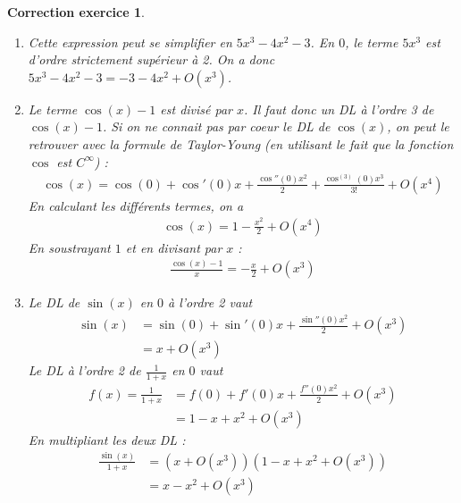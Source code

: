 \documentclass[12pt]{article}
\newtheorem{correction}{\bf Correction exercice}
\newenvironment{cor}{
\begin{correction}\smallskip\normalfont}{\end{correction}
}
\newif\ifcorrige\corrigetrue
\begin{document}
\ifcorrige
\color{magenta}
\begin{cor}
$\qquad$
\begin{enumerate}
\item Cette expression peut se simplifier en $5x^3 - 4x^2 -3$.
  En $0$, le terme $5x^3$ est d'ordre strictement supérieur à 2.
  On a donc $5x^3 - 4x^2 -3 = -3 - 4x^2 + O(x^3)$.

\item Le terme $\cos(x)-1$ est divisé par $x$. Il faut donc un DL à l'ordre 3 de $\cos(x)-1$.
  Si on ne connait pas par coeur le DL de $\cos(x)$, on peut le retrouver 
  avec la formule de Taylor-Young 
  (en utilisant le fait que la fonction $\cos$ est $C^{\infty}$) :
  \begin{align*}
    \cos(x) = \cos(0) + \cos'(0)x + \frac{\cos''(0) x^2}2 + \frac{\cos^{(3)}(0) x^3}{3!} + O(x^4)
  \end{align*}
  En calculant les différents termes, on a
  \begin{align*}
    \cos(x) = 1 - \frac{x^2}2 + O(x^4)
  \end{align*}
  En soustrayant $1$ et en divisant par $x$ :
  \begin{align*}
    \frac{\cos(x)-1}x = - \frac{x}2 + O(x^3)
  \end{align*}
\item Le DL de $\sin(x)$ en $0$ à l'ordre 2 vaut
  \begin{align*}
    \sin(x)
    &= \sin(0) + \sin'(0)x + \frac{\sin''(0)x^2}2 + O(x^3)
    \\
    &= x + O(x^3)
  \end{align*}
  Le DL à l'ordre 2 de $\frac1{1+x}$ en $0$ vaut
  \begin{align*}
    f(x) = \frac1{1+x}
    &= f(0) + f'(0)x + \frac{f''(0)x^2}2 + O(x^3)
    \\
    &= 1 - x + x^2 + O(x^3)
  \end{align*}
  En multipliant les deux DL :
  \begin{align*}
    \frac{\sin(x)}{1+x} 
    &= (x + O(x^3)) (1-x+x^2+O(x^3))
    \\
    &= x - x^2 + O(x^3)
  \end{align*}


\end{enumerate}
\end{cor}
\end{document}
